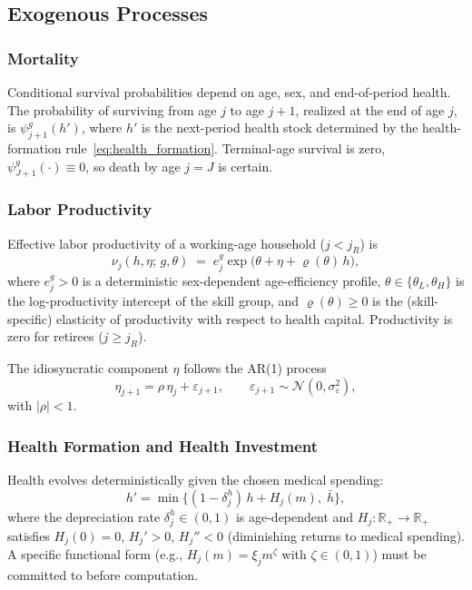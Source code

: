 \documentclass[12pt,a4paper]{article}
\begin{document}
\subsection{Exogenous Processes}
\label{subsec:exogenous}

\subsubsection{Mortality}
\label{subsubsec:mortality}

Conditional survival probabilities depend on age, sex, and end-of-period health. The probability of surviving from age $j$ to age $j+1$, realized at the end of age $j$, is $\psi_{j+1}^{g}(h')$, where $h'$ is the next-period health stock determined by the health-formation rule~\eqref{eq:health_formation}. Terminal-age survival is zero, $\psi_{J+1}^{g}(\cdot) \equiv 0$, so death by age $j = J$ is certain.

\subsubsection{Labor Productivity}
\label{subsubsec:productivity}

Effective labor productivity of a working-age household ($j < j_R$) is
\begin{equation}
\label{eq:labor_productivity}
\nu_j(h, \eta;\, g,\theta) \;=\; e_{j}^{g} \exp\bigl(\theta + \eta + \varrho(\theta)\, h\bigr),
\end{equation}
where $e_{j}^{g} > 0$ is a deterministic sex-dependent age-efficiency profile, $\theta \in \{\theta_L, \theta_H\}$ is the log-productivity intercept of the skill group, and $\varrho(\theta) \geq 0$ is the (skill-specific) elasticity of productivity with respect to health capital. Productivity is zero for retirees ($j \geq j_R$).

The idiosyncratic component $\eta$ follows the AR(1) process
\begin{equation}
\label{eq:ar1}
\eta_{j+1} = \rho\, \eta_j + \varepsilon_{j+1}, \qquad \varepsilon_{j+1} \sim \mathcal{N}(0, \sigma_\varepsilon^2),
\end{equation}
with $|\rho| < 1$. 

\subsubsection{Health Formation and Health Investment}
\label{subsubsec:health}

Health evolves deterministically given the chosen medical spending:
\begin{equation}
\label{eq:health_formation}
h' = \min\bigl\{(1 - \delta_j^h)\, h + H_j(m),\; \bar h\bigr\},
\end{equation}
where the depreciation rate $\delta_j^h \in (0, 1)$ is age-dependent and $H_j: \mathbb{R}_+ \to \mathbb{R}_+$ satisfies $H_j(0) = 0$, $H_j' > 0$, $H_j'' < 0$ (diminishing returns to medical spending). A specific functional form (e.g., $H_j(m) = \xi_j m^{\zeta}$ with $\zeta \in (0,1)$) must be committed to before computation.
\end{document}
